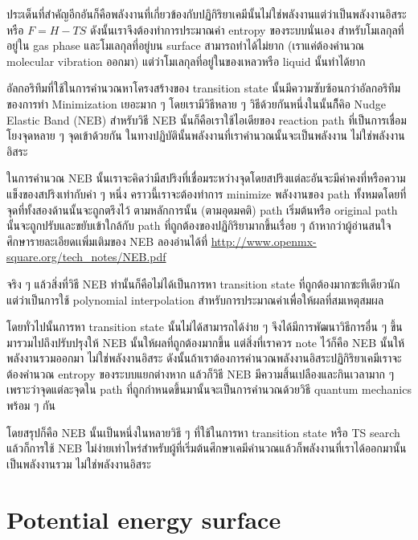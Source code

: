 ประเด็นที่สำคัญอีกอันก็คือพลังงานที่เกี่ยวข้องกับปฏิกิริยาเคมีนั้นไม่ใช่พลังงานแต่ว่าเป็นพลังงานอิสระหรือ $F = H - TS$ 
ดังนั้นเราจึงต้องทำการประมาณค่า entropy ของระบบนั่นเอง สำหรับโมเลกุลที่อยู่ใน gas phase 
และโมเลกุลที่อยู่บน surface สามารถทำได้ไม่ยาก (เราแค่ต้องคำนวณ molecular vibration ออกมา) 
แต่ว่าโมเลกุลที่อยู่ในของเหลวหรือ liquid นั้นทำได้ยาก

อัลกอริทึมที่ใช้ในการคำนวณหาโครงสร้างของ transition state นั้นมีความซับซ้อนกว่าอัลกอริทึมของการทำ 
Minimization เยอะมาก ๆ โดยเรามีวิธีหลาย ๆ วิธีด้วยกันหนึ่งในนั้นก็ึคิอ Nudge Elastic Band (NEB) 
สำหรับวิธี NEB นั้นก็คือเราใช้ไอเดียของ reaction path ที่เป็นการเชื่อมโยงจุดหลาย ๆ จุดเข้าด้วยกัน 
ในทางปฏิบัตินั้นพลังงานที่เราคำนวณนั้นจะเป็นพลังงาน ไม่ใช่พลังงานอิสระ

ในการคำนวณ NEB นั้นเราจะคิดว่ามีสปริงที่เชื่อมระหว่างจุดโดยสปริงแต่ละอันจะมีค่าคงที่หรือความแข็งของสปริงเท่ากับค่า ๆ หนึ่ง 
คราวนี้เราจะต้องทำการ minimize พลังงานของ path ทั้งหมดโดยที่จุดที่ทั้งสองด้านนั้นจะถูกตรึงไว้ ตามหลักการนั้น 
(ตามอุดมคติ) path เริ่มต้นหรือ original path นั้นจะถูกปรับและขยับเข้าใกล้กับ path ที่ถูกต้องของปฏิกิริยามากขึ้นเรื่อย ๆ 
ถ้าหากว่าผู้อ่านสนใจศึกษารายละเอียดเเพิ่มเติมของ NEB ลองอ่านได้ที่ 
\url{http://www.openmx-square.org/tech_notes/NEB.pdf}

จริง ๆ แล้วสิ่งที่วิธี NEB ทำนั้นก็คือไม่ได้เป็นการหา transition state ที่ถูกต้องมากซะทีเดียวนักแต่ว่าเป็นการใช้ 
polynomial interpolation สำหรับการประมาณค่าเพื่อให้ผลที่สมเหตุสมผล 

โดยทั่วไปนั้นการหา transition state นั้นไม่ได้สามารถได้ง่าย ๆ จึงได้มีการพัฒนาวิธีการอื่น ๆ ขึ้นมารวมไปถึงปรับปรุงให้ 
NEB นั้นให้ผลที่ถูกต้องมากขึ้น แต่สิ่งที่เราควร note ไว้ก็คือ NEB นั้นให้พลังงานรวมออกมา ไม่ใช่พลังงานอิสระ 
ดังนั้นถ้าเราต้องการคำนวณพลังงานอิสระปฏิกิริยาเคมีเราจะต้องคำนวณ entropy ของระบบแยกต่างหาก 
แล้วก็วิธี NEB มีความสิ้นเปลืองและกินเวลามาก ๆ เพราะว่าจุดแต่ละจุดใน path ที่ถูกกำหนดขึ้นมานั้นจะเป็นการคำนวณด้วยวิธี 
quantum mechanics พร้อม ๆ กัน 

โดยสรุปก็คือ NEB นั้นเป็นหนึ่งในหลายวิธี ๆ ที่ใช้ในการหา transition state หรือ TS search แล้วก็การใช้ NEB 
ไม่ง่ายเท่าไหร่สำหรับผู้ที่เริ่มต้นศึกษาเคมีคำนวณแล้วก็พลังงานที่เราได้ออกมานั้นเป็นพลังงานรวม ไม่ใช่พลังงานอิสระ 

\section{Potential energy surface}

